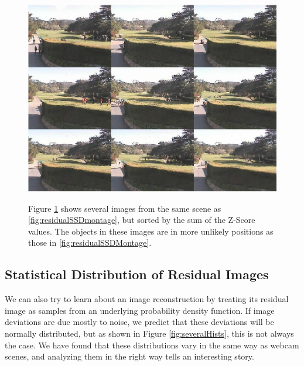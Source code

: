 \begin{figure}
	\centering
		\includegraphics[width=1\textwidth]{figures/residualZScoreMontage.jpg}
	\label{fig:residualZScoreMontage}
	
		\caption[Z-Score Montage.]{Figure \ref{fig:residualZScoreMontage} shows several images from the same scene as \ref{fig:residualSSDmontage}, but sorted by the sum of the Z-Score values.  The objects in these images are in more unlikely positions as those in \ref{fig:residualSSDMontage}.}
\end{figure}





\subsection{Statistical Distribution of Residual Images}

We can also try to learn about an image reconstruction by treating its residual image as samples from an 
underlying probability density function.  If image deviations are due mostly to noise, we predict that these deviations will be normally distributed, but as shown in Figure \ref{fig:severalHists}, this is not always the case.  We have found that these distributions vary in the same way as webcam scenes, and analyzing them in the right way tells an interesting story.


